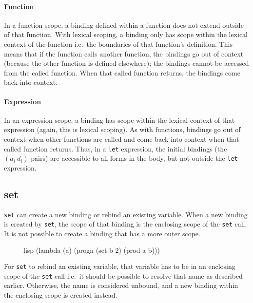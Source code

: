 \paragraph{Function}
In a function scope, a binding defined within a function does not extend outside of that function. With lexical scoping, a binding only has scope within the lexical context of the function i.e.\ the boundaries of that function's definition. This means that if the function calls another function, the bindings go out of context (because the other function is defined elsewhere); the bindings cannot be accessed from the called function. When that called function returns, the bindings come back into context.

\paragraph{Expression}
In an expression scope, a binding has scope within the lexical context of that expression (again, this is lexical scoping). As with functions, bindings go out of context when other functions are called and come back into context when that called function returns. Thus, in a \texttt{let} expression, the initial bindings (the $(a_i\ d_i)$ pairs) are accessible to all forms in the body, but not outside the \texttt{let} expression.

\subsection{set}
\texttt{set} can create a new binding or rebind an existing variable. When a new binding is created by \texttt{set}, the scope of that binding is the enclosing scope of the \texttt{set} call. It is not possible to create a binding that has a more outer scope.

\begin{figure}[htp]
    \centering
    \begin{cminted}[autogobble=true, escapeinside=??]{lisp}
        (lambda (a) (progn (set b 2) (prod a b)))
    \end{cminted}
    \captionsetup[figure]{font=small}
\end{figure}

For \texttt{set} to rebind an existing variable, that variable has to be in an enclosing scope of the \texttt{set} call i.e.\ it should be possible to resolve that name as described earlier. Otherwise, the name is considered unbound, and a new binding within the enclosing scope is created instead.

